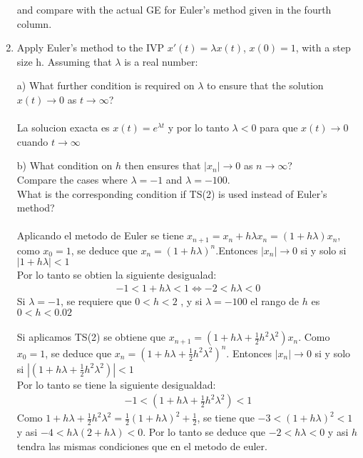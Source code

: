 \begin{enumerate}
		and compare with the actual GE for Euler’s method given in the
		fourth column.
	\item
		Apply Euler’s method to the IVP $x'(t) = \lambda x(t)$, $x(0) = 1$, with a
		step size h. Assuming that $\lambda$ is a real number:
		\item[a)]
		What further condition is required on $\lambda$ to ensure that the solution $x(t) \longrightarrow 0$ as $t \longrightarrow \infty$?\\
		\\
		La solucion exacta es $x(t) = e^{\lambda t}$ y por lo tanto $\lambda < 0$ para que
		$x(t) \longrightarrow 0$ cuando $t \longrightarrow \infty$
		\item[b)]
		What condition on $h$ then ensures that $|x_n | \longrightarrow 0$ as $n \longrightarrow \infty$?\\
		Compare the cases where $\lambda = -1$ and $\lambda = -100$.\\
		What is the corresponding condition if TS(2) is used instead of Euler’s method?\\
		\\
		Aplicando el metodo de Euler se tiene $x_{n+1} = x_n + h\lambda x_n = (1+h\lambda)x_n$, como $x_0 = 1$, se deduce que $x_n = (1+h\lambda)^n$.Entonces $|x_n | \longrightarrow 0$ si y solo si $|1 + h\lambda| < 1$\\
		Por lo tanto se obtien la siguiente desigualad:
		\begin{align*}
			-1 < 1 + h\lambda < 1 \Longleftrightarrow -2 < h\lambda < 0
		\end{align*}
		Si $\lambda = -1$, se requiere que $0 < h < 2$	, y si $\lambda = -100$ el rango de $h$ es $0 < h < 0.02$\\
		\\
		Si aplicamos TS(2) se obtiene que $x_{n+1} = (1 + h\lambda + \frac{1}{2} h^2 \lambda^2)x_n$. Como $x_0 = 1$, se deduce que $x_n = (1 + h\lambda + \frac{1}{2} h^2 \lambda^2)^n$. Entonces  $|x_n | \longrightarrow 0$ si y solo si $|(1 + h\lambda + \frac{1}{2} h^2 \lambda^2)| < 1$\\ 
		Por lo tanto se tiene la siguiente desigualdad:
		\begin{align*}
			-1 <(1 + h\lambda + \frac{1}{2} h^2 \lambda^2) < 1
		\end{align*}
		Como $1 + h\lambda + \frac{1}{2} h^2 \lambda^2 = \frac{1}{2}(1 + h\lambda)^2 + \frac{1}{2}$, se tiene que $-3 < (1 + h\lambda)^2 < 1$ y asi $-4 < h\lambda(2 + h\lambda) < 0$.
		Por lo tanto se deduce que $-2 < h\lambda < 0$ y asi $h$ tendra las mismas condiciones que en el metodo de euler.

\end{enumerate}
